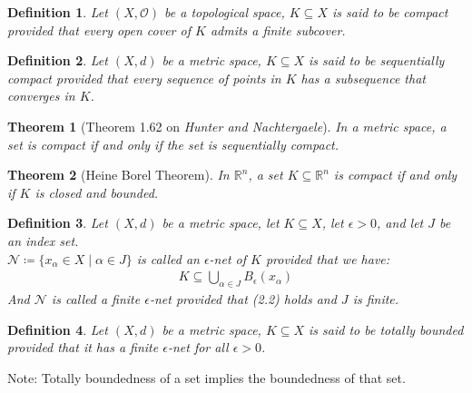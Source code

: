 \documentclass[11pt]{book}
\theoremstyle{break}
\theoremstyle{break}
\newtheorem{thm}{Theorem}[section]
\newtheorem{defn}{Definition}[corL]
\newcommand{\R}{\mathbb{R}}
\newcommand{\note}{\color{red}Note: \color{black}}
\begin{document}
\begin{defn}
Let $(X,\mathcal{O})$ be a topological space, $K \subseteq X$ is said to be compact provided that every open cover of $K$ admits a finite subcover. 
\end{defn}


\begin{defn}
Let $(X,d)$ be a metric space, $K \subseteq X$ is said to be sequentially compact provided that every sequence of points in $K$ has a subsequence that converges in $K$. 
\end{defn}

\begin{thm}[Theorem 1.62 on \textit{Hunter and Nachtergaele}]
In a metric space, a set is compact if and only if the set is sequentially compact. 
\end{thm}

\begin{thm}[Heine Borel Theorem]
In $\R^n$, a set $K \subseteq \R^n$ is compact if and only if $K$ is closed and bounded. 
\end{thm}

\begin{defn}
Let $(X,d)$ be a metric space, let $K \subseteq X$, let $\epsilon>0$, and let $J$ be an index set. \\
$\mathcal{N} \coloneqq \{x_{\alpha} \in X \mid \alpha \in J\}$ is called an $\epsilon$-net of $K$ provided that we have:
\begin{align}
K \subseteq \bigcup_{\alpha \in J} B_{\epsilon}(x_{\alpha})
\end{align}
And $\mathcal{N}$ is called a finite $\epsilon$-net provided that (2.2) holds and $J$ is finite.
\end{defn}

\begin{defn}
Let $(X,d)$ be a metric space, $K \subseteq X$ is said to be totally bounded provided that it has a finite $\epsilon$-net for all $\epsilon>0$.  
\end{defn}

\note Totally boundedness of a set implies the boundedness of that set.\\
\end{document}
